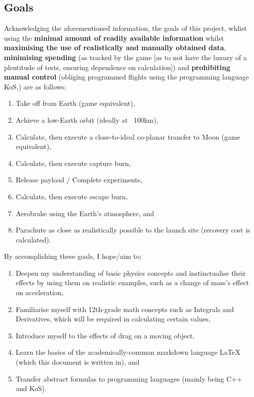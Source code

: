 \documentclass[12pt]{article}
\begin{document}
    \subsection{Goals}

    Acknowledging the aforementioned information, the goals of this project, whlist using the \textbf{minimal amount of readily available information} whilst \textbf{maximising the use of realistically and manually obtained data}, \textbf{minimising spending} (as tracked by the game [as to not have the luxury of a plentitude of tests, ensuring dependence on calculation]) and \textbf{prohibiting manual control} (obliging programmed flights using the programming language KoS,) are as follows;

    \begin{enumerate}
        \item Take off from Earth (game equivalent),
        \item Achieve a low-Earth orbit (ideally at ~100km),
        \item Calculate, then execute a close-to-ideal co-planar transfer to Moon (game equivalent),
        \item Calculate, then execute capture burn,
        \item Release payload / Complete experiments,
        \item Calculate, then execute escape burn,
        \item Aerobrake using the Earth's atmosphere, and
        \item Parachute as close as realistically possible to the launch site (recovery cost is calculated).
    \end{enumerate}

    By accomplishing these goals, I hope/aim to;
    \begin{enumerate}
        \item Deepen my understanding of basic physics concepts and instinctualise their effects by using them on realistic examples, such as a change of mass's effect on acceleration,
        \item Familiarise myself with 12th-grade math concepts such as Integrals and Derivatives, which will be required in calculating certain values,
        \item Introduce myself to the effects of drag on a moving object,
        \item Learn the basics of the academically-common markdown language LaTeX (which this document is written in), and
        \item Transfer abstract formulas to programming languages (mainly being C++ and KoS).
    \end{enumerate}
\end{document}
